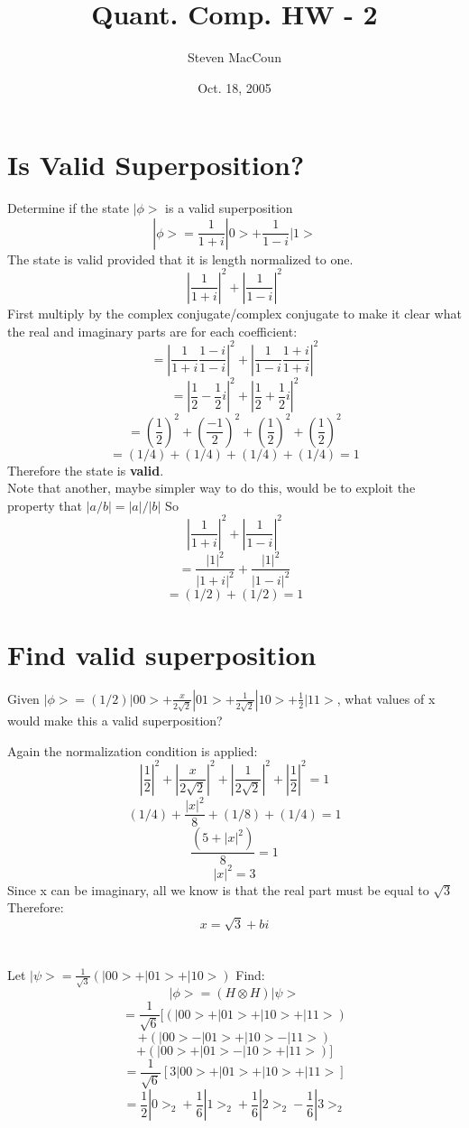 \documentclass[12pt]{article}
\title{Quant. Comp. HW - 2}
\author{Steven MacCoun}
\date{Oct. 18, 2005}
\begin{document}
\maketitle						%



\section{Is Valid Superposition?}

Determine if the state $|\phi>$ is a valid superposition $$|\phi> = \frac{1}{1+i} |0> + \frac{1}{1-i}|1>$$
The state is valid provided that  it is length normalized to one.
$$|\frac{1}{1+i}|^2 + |\frac{1}{1-i}|^2$$
First multiply by the complex conjugate/complex conjugate to make it clear what the real and imaginary parts are
for each coefficient:
$$= |\frac{1}{1+i} \frac{1-i}{1-i}|^2 + |\frac{1}{1-i} \frac{1+i}{1+i}|^2 $$
$$=|\frac{1}{2} - \frac{1}{2}i|^2 + |\frac{1}{2} + \frac{1}{2}i|^2$$
$$=( \frac{1}{2})^2 + ( \frac{-1}{2})^2 + ( \frac{1}{2})^2 + ( \frac{1}{2})^2$$
$$= (1/4) + (1/4) + (1/4) + (1/4) = 1$$
Therefore the state is \textbf{valid}.
\\Note that another, maybe simpler way to do this, would be to exploit the property that $|a/b| = |a|/|b|$
So
$$|\frac{1}{1+i}|^2 + |\frac{1}{1-i}|^2$$
$$= \frac{|1|^2}{|1+i|^2} + \frac{|1|^2}{|1-i|^2}$$
$$ = (1/2) + (1/2) = 1 $$

\section{Find valid superposition}

Given $|\phi> = (1/2)|00> + \frac{x}{2 \sqrt{2}}|01> + \frac{1}{2 \sqrt{2}}|10> +  \frac{1}{2}|11>$, what values of x would make this a valid superposition?

Again the normalization condition is applied:
$$|\frac{1}{2}|^{2} + |\frac{x}{2 \sqrt{2}}|^2 + |\frac{1}{2 \sqrt{2}}|^2 +  |\frac{1}{2}|^2 = 1$$
$$(1/4) + \frac{|x|^2}{8} + (1/8) + (1/4) = 1$$
$$\frac{(5 + |x|^2)}{8} = 1$$
$$|x|^2 = 3$$
Since x can be imaginary, all we know is that the real part must be equal to $\sqrt{3}$
Therefore:
\[
\boxed{x = \sqrt{3} + bi}
\]
\section{}

Let $|\psi> = \frac{1}{\sqrt{3}}(|00> + |01> + |10>)$
Find:
$$|\phi> = (H \otimes H)|\psi>$$
$$ =  \frac{1}{\sqrt{6}}[(|00> + |01> + |10> + |11>)$$$$ + (|00> - |01> + |10> - |11>) $$$$+ (|00> + |01> - |10> + |11>)]$$
$$ =  \frac{1}{\sqrt{6}}[3|00>+ |01> + |10> + |11>]$$
\[
\boxed{ = \frac{1}{2}|0>_{2} + \frac{1}{6}|1>_{2} + \frac{1}{6}|2>_{2} - \frac{1}{6}|3>_{2}}
\]
\end{document}
